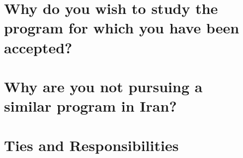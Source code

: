\section*{Why do you wish to study the program for which you have been accepted?}

\lipsum[1][1-30]

\lipsum[1][1-25]

\section*{Why are you not pursuing a similar program in Iran?}

\lipsum[1][1-15]

\lipsum[1][1-30]


\section*{Ties and Responsibilities}

\lipsum[1][1-40]

\lipsum[1][1-40]

\lipsum[1][1-40]

\clearpage

